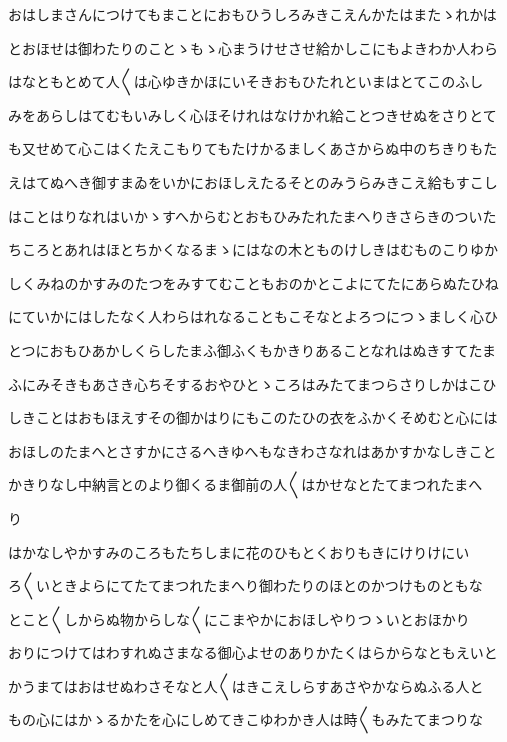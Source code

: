 \documentclass[a4paper,11pt,landscape]{ltjtarticle}
\begin{document}
おはしまさんにつけてもまことにおもひうしろみきこえんかたはまたゝれかは
\par\medskip
とおほせは御わたりのことゝもゝ心まうけせさせ給かしこにもよきわか人わら
\par\medskip
はなともとめて人〱は心ゆきかほにいそきおもひたれといまはとてこのふし
\par\medskip
みをあらしはてむもいみしく心ほそけれはなけかれ給ことつきせぬをさりとて
\par\medskip
も又せめて心こはくたえこもりてもたけかるましくあさからぬ中のちきりもた
\par\medskip
えはてぬへき御すまゐをいかにおほしえたるそとのみうらみきこえ給もすこし
\par\medskip
はことはりなれはいかゝすへからむとおもひみたれたまへりきさらきのついた
\par\medskip
ちころとあれはほとちかくなるまゝにはなの木とものけしきはむものこりゆか
\par\medskip
しくみねのかすみのたつをみすてむこともおのかとこよにてたにあらぬたひね
\par\medskip
にていかにはしたなく人わらはれなることもこそなとよろつにつゝましく心ひ
\par\medskip
とつにおもひあかしくらしたまふ御ふくもかきりあることなれはぬきすてたま
\par\medskip
ふにみそきもあさき心ちそするおやひとゝころはみたてまつらさりしかはこひ
\par\medskip
しきことはおもほえすその御かはりにもこのたひの衣をふかくそめむと心には
\par\medskip
おほしのたまへとさすかにさるへきゆへもなきわさなれはあかすかなしきこと
\par\medskip
かきりなし中納言とのより御くるま御前の人〱はかせなとたてまつれたまへ
\par\medskip
り
\par\medskip
はかなしやかすみのころもたちしまに花のひもとくおりもきにけりけにい
\par\medskip
ろ〱いときよらにてたてまつれたまへり御わたりのほとのかつけものともな
\par\medskip
とこと〱しからぬ物からしな〱にこまやかにおほしやりつゝいとおほかり
\par\medskip
おりにつけてはわすれぬさまなる御心よせのありかたくはらからなともえいと
\par\medskip
かうまてはおはせぬわさそなと人〱はきこえしらすあさやかならぬふる人と
\par\medskip
もの心にはかゝるかたを心にしめてきこゆわかき人は時〱もみたてまつりな
\par\medskip
\end{document}
